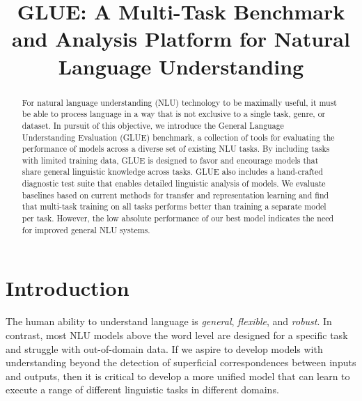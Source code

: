 \title{GLUE: A Multi-Task Benchmark and Analysis Platform for Natural Language Understanding}



\maketitle

\begin{abstract}
For natural language understanding (NLU) technology to be maximally useful, it must be able to process language in a way that is not exclusive to a single task, genre, or dataset.
In pursuit of this objective, we introduce the General Language Understanding Evaluation (GLUE) benchmark, a collection of tools for evaluating the performance of models across a diverse set of existing NLU tasks.
By including tasks with limited training data, GLUE is designed to favor and encourage models that share general linguistic knowledge across tasks.
GLUE also includes a hand-crafted diagnostic test suite that enables detailed linguistic analysis of models.
We evaluate baselines based on current methods for transfer and representation learning and find that multi-task training on all tasks performs better than training a separate model per task. However, the low absolute performance of our best model indicates the need for improved general NLU systems. 
\end{abstract}

\section{Introduction}\label{sec:intro}

The human ability to understand language is \emph{general}, \textit{flexible}, and \textit{robust}. 
In contrast, most NLU models above the word level are designed for a specific task and struggle with out-of-domain data. 
If we aspire to develop models with understanding beyond the detection of superficial correspondences between inputs and outputs, 
then it is critical to develop a more unified model that can learn to execute a range of different linguistic tasks in different domains.

